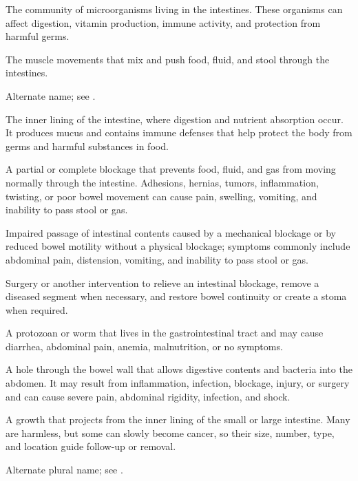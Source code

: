  The community of microorganisms living in the intestines. These organisms can affect digestion, vitamin production, immune activity, and protection from harmful germs.

 The muscle movements that mix and push food, fluid, and stool through the intestines.

 Alternate name; see .

 The inner lining of the intestine, where digestion and nutrient absorption occur. It produces mucus and contains immune defenses that help protect the body from germs and harmful substances in food.

 A partial or complete blockage that prevents food, fluid, and gas from moving normally through the intestine. Adhesions, hernias, tumors, inflammation, twisting, or poor bowel movement can cause pain, swelling, vomiting, and inability to pass stool or gas.

 Impaired passage of intestinal contents caused by a mechanical blockage or by reduced bowel motility without a physical blockage; symptoms commonly include abdominal pain, distension, vomiting, and inability to pass stool or gas.

 Surgery or another intervention to relieve an intestinal blockage, remove a diseased segment when necessary, and restore bowel continuity or create a stoma when required.

 A protozoan or worm that lives in the gastrointestinal tract and may cause diarrhea, abdominal pain, anemia, malnutrition, or no symptoms.

 A hole through the bowel wall that allows digestive contents and bacteria into the abdomen. It may result from inflammation, infection, blockage, injury, or surgery and can cause severe pain, abdominal rigidity, infection, and shock.

 A growth that projects from the inner lining of the small or large intestine. Many are harmless, but some can slowly become cancer, so their size, number, type, and location guide follow-up or removal.

 Alternate plural name; see .

